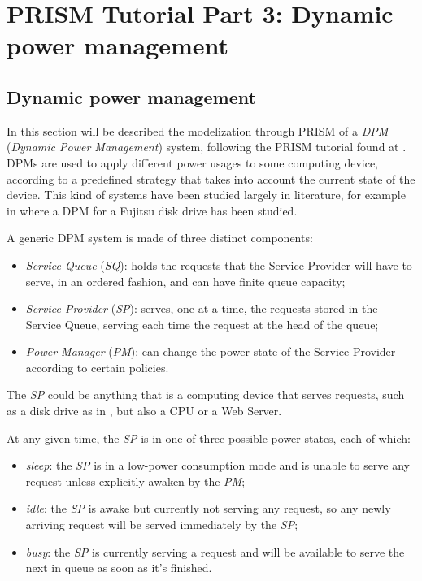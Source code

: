 
\section*{PRISM Tutorial Part 3: Dynamic power management}

  \subsection*{Dynamic power management}

    In this section will be described the modelization through PRISM of a \textit{DPM} (\textit{Dynamic Power Management}) system, following the PRISM tutorial found at \cite{prism-tutorial3}. DPMs are used to apply different power usages to some computing device, according to a predefined strategy that takes into account the current state of the device. This kind of systems have been studied largely in literature, for example in \cite{qiu2001stochastic} where a DPM for a Fujitsu disk drive has been studied.
    
    A generic DPM system is made of three distinct components:
    
    \begin{itemize}
      \item \textit{Service Queue} (\textit{SQ}): holds the requests that the Service Provider will have to serve, in an ordered fashion, and can have finite queue capacity;
      \item \textit{Service Provider} (\textit{SP}): serves, one at a time, the requests stored in the Service Queue, serving each time the request at the head of the queue;
      \item \textit{Power Manager} (\textit{PM}): can change the power state of the Service Provider according to certain policies.
    \end{itemize}
    
    The \textit{SP} could be anything that is a computing device that serves requests, such as a disk drive as in \cite{qiu2001stochastic}, but also a CPU or a Web Server.
    
    At any given time, the \textit{SP} is in one of three possible power states, each of which:
    
    \begin{itemize}
      \item \textit{sleep}: the \textit{SP} is in a low-power consumption mode and is unable to serve any request unless explicitly awaken by the \textit{PM};
      \item \textit{idle}: the \textit{SP} is awake but currently not serving any request, so any newly arriving request will be served immediately by the \textit{SP};
      \item \textit{busy}: the \textit{SP} is currently serving a request and will be available to serve the next in queue as soon as it's finished.
    \end{itemize}
    
